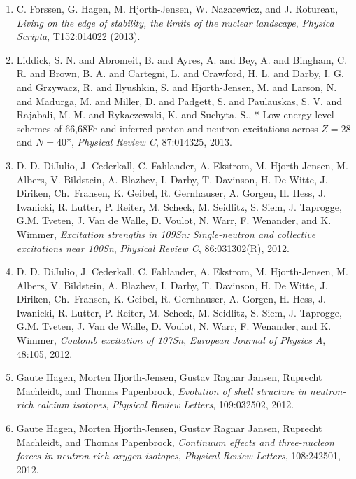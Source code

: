 \documentclass[a4wide,10pt]{article}
\begin{document}
\begin{enumerate}
\item C. Forssen, G. Hagen, M. Hjorth-Jensen, W. Nazarewicz, and J. Rotureau,  \emph{Living on the edge of stability, the limits of the nuclear landscape},   \emph{Physica Scripta},  T152:014022 (2013). 

\item Liddick, S. N. and Abromeit, B. and Ayres, A. and Bey, A. and Bingham, C. R. and Brown, B. A. and Cartegni, L. and Crawford, H. L. and Darby, I. G. and Grzywacz, R. and Ilyushkin, S. and Hjorth-Jensen, M. and Larson, N. and Madurga, M. and Miller, D. and Padgett, S. and Paulauskas, S. V. and Rajabali, M. M. and Rykaczewski, K. and Suchyta, S.,  * Low-energy level schemes of 66,68Fe and inferred proton and neutron excitations across $Z=28$ and $N=40$*,   \emph{Physical Review C},  87:014325, 2013.  

\item D. D. DiJulio, J. Cederkall, C. Fahlander, A. Ekstrom, M. Hjorth-Jensen, M. Albers, V. Bildstein, A. Blazhev, I. Darby, T. Davinson, H. De Witte, J. Diriken, Ch.~Fransen, K. Geibel, R. Gernhauser, A. Gorgen, H. Hess, J. Iwanicki, R. Lutter, P. Reiter, M. Scheck, M. Seidlitz, S. Siem, J. Taprogge, G.M. Tveten, J. Van de Walle, D. Voulot, N. Warr, F. Wenander, and K. Wimmer,  \emph{Excitation strengths in 109Sn: Single-neutron and collective excitations near 100Sn},   \emph{Physical Review C},  86:031302(R), 2012. 

\item D. D. DiJulio, J. Cederkall, C. Fahlander, A. Ekstrom, M. Hjorth-Jensen, M. Albers, V. Bildstein, A. Blazhev, I. Darby, T. Davinson, H. De Witte, J. Diriken, Ch.~Fransen, K. Geibel, R. Gernhauser, A. Gorgen, H. Hess, J. Iwanicki, R. Lutter, P. Reiter, M. Scheck, M. Seidlitz, S. Siem, J. Taprogge, G.M. Tveten, J. Van de Walle, D. Voulot, N. Warr, F. Wenander, and K. Wimmer,  \emph{Coulomb excitation of 107Sn},   \emph{European Journal of Physics A}, 48:105,  2012.  

\item Gaute Hagen, Morten Hjorth-Jensen, Gustav Ragnar Jansen, Ruprecht Machleidt, and Thomas Papenbrock, \emph{Evolution of shell structure in neutron-rich calcium isotopes},   \emph{Physical Review Letters}, 109:032502, 2012. 

\item Gaute Hagen, Morten Hjorth-Jensen, Gustav Ragnar Jansen, Ruprecht Machleidt, and Thomas Papenbrock, \emph{Continuum effects and three-nucleon forces in neutron-rich  oxygen isotopes},   \emph{Physical Review Letters}, 108:242501, 2012.  


\end{enumerate}
\end{document}
